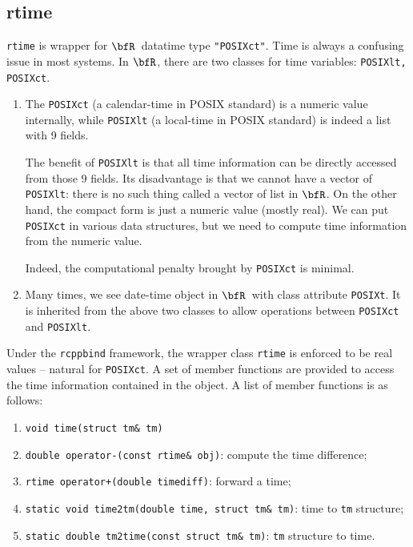 \documentclass{article}
\newcommand{\R}{$\bfR$}
\begin{document}
\subsection{rtime}
    
\texttt{rtime} is wrapper for \R\ datatime type
\texttt{"POSIXct"}. Time is always a confusing issue in most
systems. In \R, there are two classes for time variables:
\texttt{POSIXlt, POSIXct}.
\begin{enumerate}
  \item The \texttt{POSIXct} (a calendar-time in POSIX
    standard) is a numeric value internally, while
    \texttt{POSIXlt} (a local-time in POSIX standard) is
    indeed a list with 9 fields.

    The benefit of \texttt{POSIXlt} is that all time
    information can be directly accessed from those 9 fields.
    Its disadvantage is that we cannot have a vector of
    \texttt{POSIXlt}: there is no such thing called a vector
    of list in \R. On the other hand, the compact form is
    just a numeric value (mostly real). We can put
    \texttt{POSIXct} in various data structures, but we need
    to compute time information from the numeric value.

    Indeed, the computational penalty brought by
    \texttt{POSIXct} is minimal.
  \item Many times, we see date-time object in \R\ with class
    attribute \texttt{POSIXt}. It is inherited from the above
    two classes to allow operations between \texttt{POSIXct}
    and \texttt{POSIXlt}.
\end{enumerate}

Under the \texttt{rcppbind} framework, the wrapper class
\texttt{rtime} is enforced to be real values -- natural for
\texttt{POSIXct}. A set of member functions are provided to
access the time information contained in the object. A list
of member functions is as follows:
\begin{enumerate}
  \item \texttt{void time(struct tm\& tm)} 
  \item \texttt{double operator-(const rtime\& obj)}: compute the time difference;
  \item \texttt{rtime operator+(double timediff)}: forward a time;
  \item \texttt{static void time2tm(double time, struct tm\&
    tm)}: time to \texttt{tm} structure;
  \item \texttt{static double tm2time(const struct tm\& tm)}:
    \texttt{tm} structure to time.
\end{enumerate}
\end{document}
